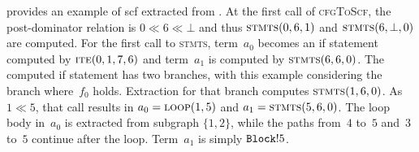 \begin{example}
   provides an example of \ac{scf} extracted from .
  At the first call of \textsc{cfgToScf},
  the post-dominator relation is $0\ll 6\ll\bot$%
  and thus $\textsc{stmts}(0,6,1)$ and $\textsc{stmts}(6,\bot,0)$ are computed.
  For the first call to \textsc{stmts},
  term~$a_0$ becomes an if statement computed by $\textsc{ite}(0,1,7,6)$
  and term~$a_1$ is computed by $\textsc{stmts}(6,6,0)$.
  The computed if statement has two branches,
  with this example considering the branch where~$f_0$ holds.
  Extraction for that branch computes $\textsc{stmts}(1,6,0)$.
  As $1\ll 5$, that call results in $a_0=\textsc{loop}(1,5)$
  and $a_1=\textsc{stmts}(5,6,0)$.
  The loop body in~$a_0$ is extracted from subgraph $\{1,2\}$,%
  while the paths from~$4$ to~$5$ and~$3$ to~$5$ continue after the loop.
  Term~$a_1$ is simply $\texttt{Block}!5$.
\end{example}

